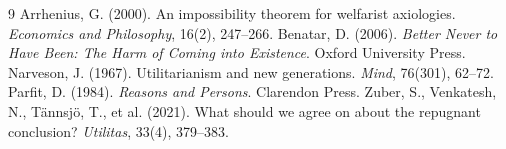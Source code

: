\documentclass{situationist-preprint}
\begin{document}
\begin{thebibliography}{9}\small
{} Arrhenius, G. (2000). An impossibility theorem for welfarist axiologies. \emph{Economics and Philosophy}, 16(2), 247--266.
 Benatar, D. (2006). \emph{Better Never to Have Been: The Harm of Coming into Existence}. Oxford University Press.
 Narveson, J. (1967). Utilitarianism and new generations. \emph{Mind}, 76(301), 62--72.
 Parfit, D. (1984). \emph{Reasons and Persons}. Clarendon Press.
 Zuber, S., Venkatesh, N., T{\"a}nnsj{\"o}, T., et al. (2021). What should we agree on about the repugnant conclusion? \emph{Utilitas}, 33(4), 379--383.
\end{thebibliography}
\end{document}
